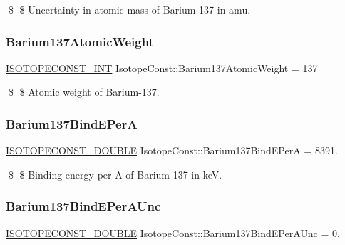\$ \$ Uncertainty in atomic mass of Barium-\/137 in amu. \mbox{\label{group___isotope_const-_barium-_ba137_ga79908e640b9cebea33a4490e7931a5ba}} 
\subsubsection{\texorpdfstring{Barium137\+Atomic\+Weight}{Barium137AtomicWeight}}
{\footnotesize\ttfamily \mbox{\hyperlink{group___isotope_const-_macros_ga5f18360b3e99483a35c32d789e62621c}{I\+S\+O\+T\+O\+P\+E\+C\+O\+N\+S\+T\+\_\+\+I\+NT}} Isotope\+Const\+::\+Barium137\+Atomic\+Weight = 137}

\$ \$ Atomic weight of Barium-\/137. \mbox{\label{group___isotope_const-_barium-_ba137_gaac56c59211a8ae13a754c9a0b112b710}} 
\subsubsection{\texorpdfstring{Barium137\+Bind\+E\+PerA}{Barium137BindEPerA}}
{\footnotesize\ttfamily \mbox{\hyperlink{group___isotope_const-_macros_ga8f45a7272ce02c0b4c65c44636ed719a}{I\+S\+O\+T\+O\+P\+E\+C\+O\+N\+S\+T\+\_\+\+D\+O\+U\+B\+LE}} Isotope\+Const\+::\+Barium137\+Bind\+E\+PerA = 8391.}

\$ \$ Binding energy per A of Barium-\/137 in keV. \mbox{\label{group___isotope_const-_barium-_ba137_ga71c291092de69b7a518a0f233574d8fc}} 
\subsubsection{\texorpdfstring{Barium137\+Bind\+E\+Per\+A\+Unc}{Barium137BindEPerAUnc}}
{\footnotesize\ttfamily \mbox{\hyperlink{group___isotope_const-_macros_ga8f45a7272ce02c0b4c65c44636ed719a}{I\+S\+O\+T\+O\+P\+E\+C\+O\+N\+S\+T\+\_\+\+D\+O\+U\+B\+LE}} Isotope\+Const\+::\+Barium137\+Bind\+E\+Per\+A\+Unc = 0.}

